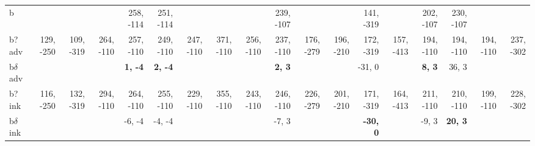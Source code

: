 \begin{table}[p]
{\begin{tabular}{lrrrrrrrrrrrrrrrrr}
b &  &  &  & 258, -114 & 251, -114 &  &  &  & 239, -107 &  &  & 141, -319 &  & 202, -107 & 230, -107 &  &  \\
b? adv & 129, -250 & 109, -319 & 264, -110 & 257, -110 & 249, -110 & 247, -110 & 371, -110 & 256, -110 & 237, -110 & 176, -279 & 196, -210 & 172, -319 & 157, -413 & 194, -110 & 194, -110 & 194, -110 & 237, -302 \\
b$\delta$ adv &  &  &  & \textbf{1, -4} & \textbf{2, -4} &  &  &  & \textbf{2, 3} &  &  & -31, 0 &  & \textbf{8, 3} & 36, 3 &  &  \\
b? ink & 116, -250 & 132, -319 & 294, -110 & 264, -110 & 255, -110 & 229, -110 & 355, -110 & 243, -110 & 246, -110 & 226, -279 & 201, -210 & 171, -319 & 164, -413 & 211, -110 & 210, -110 & 199, -110 & 228, -302 \\
b$\delta$ ink &  &  &  & -6, -4 & -4, -4 &  &  &  & -7, 3 &  &  & \textbf{-30, 0} &  & -9, 3 & \textbf{20, 3} &  &  \\

\end{tabular}
}
\end{table}
\clearpage


